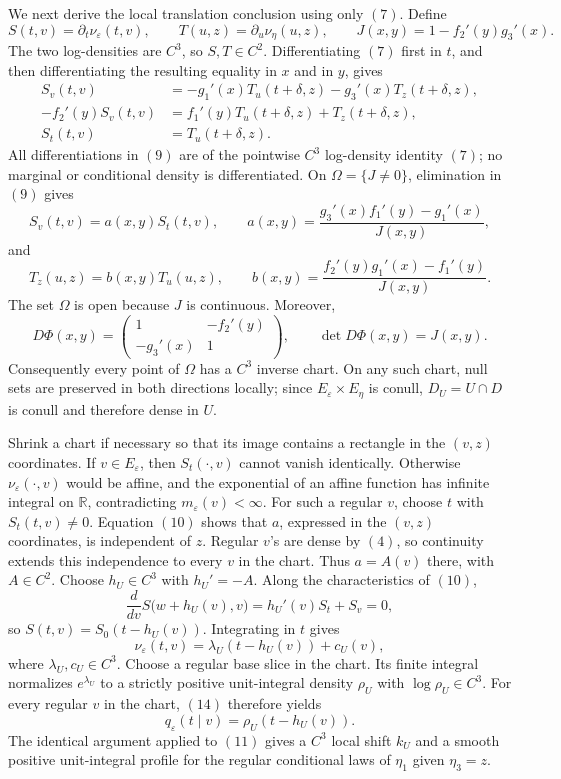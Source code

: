 We next derive the local translation conclusion using only \((7)\).  Define
\[
 S(t,v)=\partial_t\nu_\varepsilon(t,v),
 \qquad
 T(u,z)=\partial_u\nu_\eta(u,z),
 \qquad
 J(x,y)=1-f_2'(y)g_3'(x).
\tag{8}
\]
The two log-densities are \(C^3\), so \(S,T\in C^2\).  Differentiating \((7)\) first in \(t\), and then differentiating the resulting equality in \(x\) and in \(y\), gives
\[
 \begin{aligned}
 S_v(t,v)&=-g_1'(x)T_u(t+\delta,z)-g_3'(x)T_z(t+\delta,z),\\
 -f_2'(y)S_v(t,v)&=f_1'(y)T_u(t+\delta,z)+T_z(t+\delta,z),\\
 S_t(t,v)&=T_u(t+\delta,z).
 \end{aligned}
\tag{9}
\]
All differentiations in \((9)\) are of the pointwise \(C^3\) log-density identity \((7)\); no marginal or conditional density is differentiated.  On \(\Omega=\{J\ne0\}\), elimination in \((9)\) gives
\[
 S_v(t,v)=a(x,y)S_t(t,v),
 \qquad
 a(x,y)=\frac{g_3'(x)f_1'(y)-g_1'(x)}{J(x,y)},
\tag{10}
\]
and
\[
 T_z(u,z)=b(x,y)T_u(u,z),
 \qquad
 b(x,y)=\frac{f_2'(y)g_1'(x)-f_1'(y)}{J(x,y)}.
\tag{11}
\]
The set \(\Omega\) is open because \(J\) is continuous.  Moreover,
\[
 D\Phi(x,y)=
 \begin{pmatrix}1&-f_2'(y)\\-g_3'(x)&1\end{pmatrix},
 \qquad \det D\Phi(x,y)=J(x,y).
\tag{12}
\]
Consequently every point of \(\Omega\) has a \(C^3\) inverse chart.  On any such chart, null sets are preserved in both directions locally; since \(E_\varepsilon\times E_\eta\) is conull, \(D_U=U\cap D\) is conull and therefore dense in \(U\).

Shrink a chart if necessary so that its image contains a rectangle in the \((v,z)\) coordinates.  If \(v\in E_\varepsilon\), then \(S_t(\mathord\cdot,v)\) cannot vanish identically.  Otherwise \(\nu_\varepsilon(\mathord\cdot,v)\) would be affine, and the exponential of an affine function has infinite integral on \(\mathbb R\), contradicting \(m_\varepsilon(v)<\infty\).  For such a regular \(v\), choose \(t\) with \(S_t(t,v)\ne0\).  Equation \((10)\) shows that \(a\), expressed in the \((v,z)\) coordinates, is independent of \(z\).  Regular \(v\)'s are dense by \((4)\), so continuity extends this independence to every \(v\) in the chart.  Thus \(a=A(v)\) there, with \(A\in C^2\).  Choose \(h_U\in C^3\) with \(h_U'=-A\).  Along the characteristics of \((10)\),
\[
 \frac{d}{dv}S\bigl(w+h_U(v),v\bigr)
 =h_U'(v)S_t+S_v=0,
\tag{13}
\]
so \(S(t,v)=S_0(t-h_U(v))\).  Integrating in \(t\) gives
\[
 \nu_\varepsilon(t,v)=\lambda_U(t-h_U(v))+c_U(v),
\tag{14}
\]
where \(\lambda_U,c_U\in C^3\).  Choose a regular base slice in the chart.  Its finite integral normalizes \(e^{\lambda_U}\) to a strictly positive unit-integral density \(\rho_U\) with \(\log\rho_U\in C^3\).  For every regular \(v\) in the chart, \((14)\) therefore yields
\[
 q_\varepsilon(t\mid v)=\rho_U(t-h_U(v)).
\tag{15}
\]
The identical argument applied to \((11)\) gives a \(C^3\) local shift \(k_U\) and a smooth positive unit-integral profile for the regular conditional laws of \(\eta_1\) given \(\eta_3=z\).

